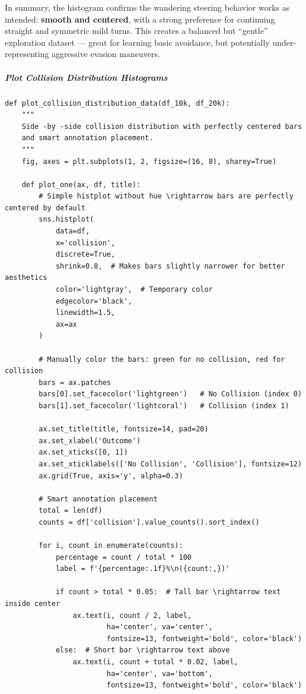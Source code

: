 In summary, the histogram confirms the wandering steering behavior works as intended: \textbf{smooth and centered}, with a strong preference for continuing straight and symmetric mild turns. This creates a balanced but ``gentle'' exploration dataset --- great for learning basic avoidance, but potentially under-representing aggressive evasion maneuvers.

\subparagraph{Plot Collision Distribution Histograms}

\begin{verbatim}
def plot_collision_distribution_data(df_10k, df_20k):
    """
    Side -by -side collision distribution with perfectly centered bars
    and smart annotation placement.
    """
    fig, axes = plt.subplots(1, 2, figsize=(16, 8), sharey=True)
    
    def plot_one(ax, df, title):
        # Simple histplot without hue \rightarrow bars are perfectly centered by default
        sns.histplot(
            data=df,
            x='collision',
            discrete=True,
            shrink=0.8,  # Makes bars slightly narrower for better aesthetics
            color='lightgray',  # Temporary color
            edgecolor='black',
            linewidth=1.5,
            ax=ax
        )
        
        # Manually color the bars: green for no collision, red for collision
        bars = ax.patches
        bars[0].set_facecolor('lightgreen')   # No Collision (index 0)
        bars[1].set_facecolor('lightcoral')   # Collision (index 1)
        
        ax.set_title(title, fontsize=14, pad=20)
        ax.set_xlabel('Outcome')
        ax.set_xticks([0, 1])
        ax.set_xticklabels(['No Collision', 'Collision'], fontsize=12)
        ax.grid(True, axis='y', alpha=0.3)
        
        # Smart annotation placement
        total = len(df)
        counts = df['collision'].value_counts().sort_index()
        
        for i, count in enumerate(counts):
            percentage = count / total * 100
            label = f'{percentage:.1f}%\n({count:,})'
            
            if count > total * 0.05:  # Tall bar \rightarrow text inside center
                ax.text(i, count / 2, label,
                        ha='center', va='center',
                        fontsize=13, fontweight='bold', color='black')
            else:  # Short bar \rightarrow text above
                ax.text(i, count + total * 0.02, label,
                        ha='center', va='bottom',
                        fontsize=13, fontweight='bold', color='black')
    

\end{verbatim}
